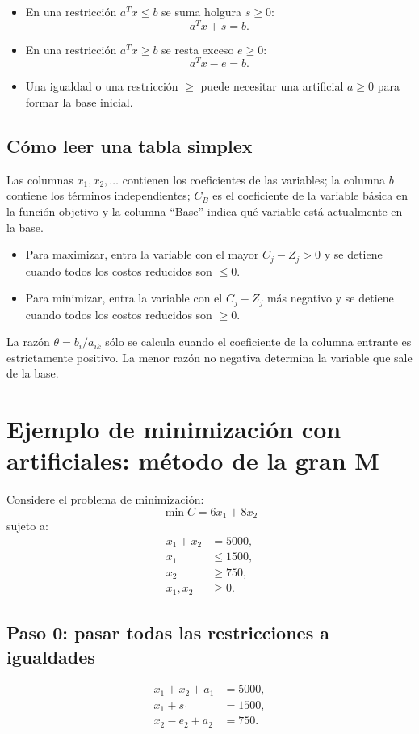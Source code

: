 \documentclass[12pt,a4paper]{article}
\begin{document}
\begin{itemize}
    \item En una restricción \(a^Tx\leq b\) se suma holgura \(s\geq0\):
    \[
    a^Tx+s=b.
    \]
    \item En una restricción \(a^Tx\geq b\) se resta exceso \(e\geq0\):
    \[
    a^Tx-e=b.
    \]
    \item Una igualdad o una restricción \(\geq\) puede necesitar una artificial \(a\geq0\) para formar la base inicial.
\end{itemize}

\subsection{Cómo leer una tabla simplex}

Las columnas \(x_1,x_2,\ldots\) contienen los coeficientes de las variables; la columna \(b\) contiene los términos independientes; \(C_B\) es el coeficiente de la variable básica en la función objetivo y la columna ``Base'' indica qué variable está actualmente en la base.

\begin{itemize}
    \item Para maximizar, entra la variable con el mayor \(C_j-Z_j>0\) y se detiene cuando todos los costos reducidos son \(\leq0\).
    \item Para minimizar, entra la variable con el \(C_j-Z_j\) más negativo y se detiene cuando todos los costos reducidos son \(\geq0\).
\end{itemize}

La razón \(\theta=b_i/a_{ik}\) sólo se calcula cuando el coeficiente de la columna entrante es estrictamente positivo. La menor razón no negativa determina la variable que sale de la base.

\section{Ejemplo de minimización con artificiales: método de la gran M}

Considere el problema de minimización:
\[
\min C=6x_1+8x_2
\]
sujeto a:
\[
\begin{aligned}
x_1+x_2&=5000,\\
x_1&\leq1500,\\
x_2&\geq750,\\
x_1,x_2&\geq0.
\end{aligned}
\]

\subsection*{Paso 0: pasar todas las restricciones a igualdades}
\[
\begin{aligned}
x_1+x_2+a_1&=5000,\\
x_1+s_1&=1500,\\
x_2-e_2+a_2&=750.
\end{aligned}
\]
\end{document}

